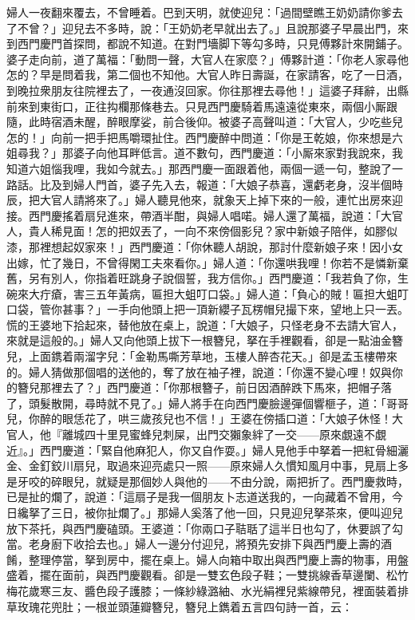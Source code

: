 婦人一夜翻來覆去，不曾睡着。巴到天明，就使迎兒：「過間壁瞧王奶奶請你爹去了不曾？」迎兒去不多時，說：「王奶奶老早就出去了。」且說那婆子早晨出門，來到西門慶門首探問，都說不知道。在對門墻脚下等勾多時，只見傅夥計來開鋪子。婆子走向前，道了萬福：「動問一聲，大官人在家麼？」傅夥計道：「你老人家尋他怎的？早是問着我，第二個也不知他。大官人昨日壽誕，在家請客，吃了一日酒，到晚拉衆朋友往院裡去了，一夜通沒回家。你往那裡去尋他！」這婆子拜辭，出縣前來到東街口，正往抅欄那條巷去。只見西門慶騎着馬遠遠從東來，兩個小厮跟隨，此時宿酒未醒，醉眼摩娑，前合後仰。被婆子高聲叫道：「大官人，少吃些兒怎的！」向前一把手把馬嚼環扯住。西門慶醉中問道：「你是王乾娘，你來想是六姐尋我？」那婆子向他耳畔低言。道不數句，西門慶道：「小厮來家對我說來，我知道六姐惱我哩，我如今就去。」那西門慶一面跟着他，兩個一遞一句，整說了一路話。比及到婦人門首，婆子先入去，報道：「大娘子恭喜，還虧老身，沒半個時辰，把大官人請將來了。」婦人聽見他來，就象天上掉下來的一般，連忙出房來迎接。西門慶搖着扇兒進來，帶酒半酣，與婦人唱喏。婦人還了萬福，說道：「大官人，貴人稀見面！怎的把奴丟了，一向不來傍個影兒？家中新娘子陪伴，如膠似漆，那裡想起奴家來！」西門慶道：「你休聽人胡說，那討什麼新娘子來！因小女出嫁，忙了幾日，不曾得閑工夫來看你。」婦人道：「你還哄我哩！你若不是憐新棄舊，另有別人，你指着旺跳身子說個誓，我方信你。」西門慶道：「我若負了你，生碗來大疔瘡，害三五年黃病，匾担大蛆叮口袋。」婦人道：「負心的賊！匾担大蛆叮口袋，管你甚事？」一手向他頭上把一頂新纓子瓦楞帽兒撮下來，望地上只一丟。慌的王婆地下拾起來，替他放在桌上，說道：「大娘子，只怪老身不去請大官人，來就是這般的。」婦人又向他頭上拔下一根簪兒，拏在手裡觀看，卻是一點油金簪兒，上面鎸着兩溜字兒：「金勒馬嘶芳草地，玉樓人醉杏花天。」{}卻是孟玉樓帶來的。婦人猜做那個唱的送他的，奪了放在袖子裡，說道：「你還不變心哩！奴與你的簪兒那裡去了？」西門慶道：「你那根簪子，前日因酒醉跌下馬來，把帽子落了，頭髮散開，尋時就不見了。」婦人將手在向西門慶臉邊彈個響榧子，道：「哥哥兒，你醉的眼恁花了，哄三歲孩兒也不信！」王婆在傍插口道：「大娘子休怪！大官人，他『離城四十里見蜜蜂兒刺屎，出門交獺象絆了一交——原來覷遠不覷近』。」{}西門慶道：「緊自他麻犯人，你又自作耍。」婦人見他手中拏着一把紅骨細灑金、金釘鉸川扇兒，取過來迎亮處只一照——原來婦人久慣知風月中事，見扇上多是牙咬的碎眼兒，就疑是那個妙人與他的——不由分說，兩把折了。西門慶救時，已是扯的爛了，說道：「這扇子是我一個朋友卜志道送我的，{}一向藏着不曾用，今日纔拏了三日，被你扯爛了。」那婦人奚落了他一回，只見迎兒拏茶來，便叫迎兒放下茶托，與西門慶磕頭。王婆道：「你兩口子聐聒了這半日也勾了，休要誤了勾當。老身廚下收拾去也。」婦人一邊分付迎兒，將預先安排下與西門慶上壽的酒餚，整理停當，拏到房中，擺在桌上。婦人向箱中取出與西門慶上壽的物事，用盤盛着，擺在面前，與西門慶觀看。卻是一雙玄色段子鞋；一雙挑線香草邊闌、松竹梅花歲寒三友、醬色段子護膝；一條紗綠潞紬、水光絹裡兒紫線帶兒，裡面裝着排草玫瑰花兜肚；一根並頭蓮瓣簪兒，簪兒上鐫着五言四句詩一首，云：

